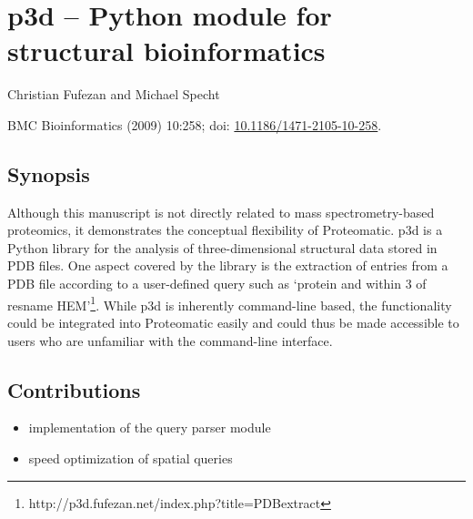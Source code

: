 \cleardoublepage
\section{p3d -- Python module for structural bioinformatics}

Christian Fufezan and Michael Specht

BMC Bioinformatics (2009) 10:258; doi: \href{http://dx.doi.org/10.1186/1471-2105-10-258}{10.1186/1471-2105-10-258}.

\subsection*{Synopsis}

Although this manuscript is not directly related to mass spectrometry-based
proteomics, it demonstrates the conceptual flexibility of Proteomatic.
p3d is a Python library for the analysis of three-dimensional structural
data stored in PDB files.
One aspect covered by the library is the extraction of entries from a PDB file
according to a user-defined query such as `protein and within 3 of resname 
HEM'\footnote{http://p3d.fufezan.net/index.php?title=PDBextract}.
While p3d is inherently command-line based, the functionality could be
integrated into Proteomatic easily and could thus be made accessible to users 
who are unfamiliar with the command-line interface.

\subsection*{Contributions}

\begin{itemize}
\item implementation of the query parser module
\item speed optimization of spatial queries
\end{itemize}

{}
